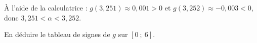 \documentclass[11pt,a4paper]{article}  %
\begin{document}
\begin{enumMet}
\begin{corrBox}
		À l'aide de la calculatrice : $g(3{,}251)\approx 0{,}001>0$ et $g(3{,}252)\approx -0{,}003<0$, donc $3{,}251<\alpha<3{,}252$.
	\end{corrBox}
	\item En déduire le tableau de signes de $g$ sur $[0\ ;\ 6]$.

	\begin{corrBox}
		\begin{center}
		\end{center}
	\end{corrBox}
\end{enumMet}
\end{document}
